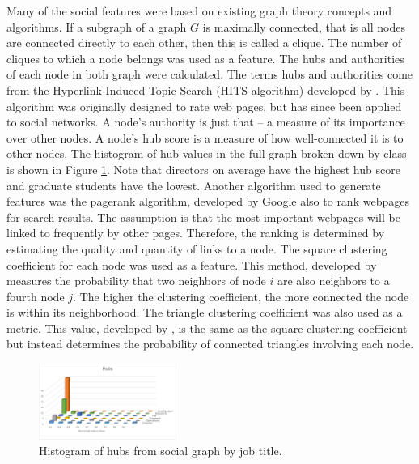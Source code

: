 \documentclass{article}
\begin{document}
Many of the social features were based on existing graph theory concepts and algorithms. If a subgraph of a graph $G$ is maximally connected, that is all nodes are connected directly to each other, then this is called a clique.  The number of cliques to which a node belongs was used as a feature.  The hubs and authorities of each node in both graph were calculated.  The terms hubs and authorities come from the Hyperlink-Induced Topic Search (HITS algorithm) developed by \cite{kleinberg_hubs_1999}.  This algorithm was originally designed to rate web pages, but has since been applied to social networks. A node's authority is just that -- a measure of its importance over other nodes.  A node's hub score is a measure of how well-connected it is to other nodes.  The histogram of hub values in the full graph broken down by class is shown in Figure \ref{fig:social_ex_hist}.  Note that directors on average have the highest hub score and graduate students have the lowest. Another algorithm used to generate features was the pagerank algorithm, developed by Google \cite{page_pagerank_1999} also to rank webpages for search results.  The assumption is that the most important webpages will be linked to frequently by other pages.  Therefore, the ranking is determined by estimating the quality and quantity of links to a node.  The square clustering coefficient for each node was used as a feature.  This method, developed by \cite{lind_cycles_2005} measures the probability that two neighbors of node $i$ are also neighbors to a fourth node $j$.  The higher the clustering coefficient, the more connected the node is within its neighborhood.  The triangle clustering coefficient was also used as a metric.  This value, developed by \cite{saramaki_generalizations_2007}, is the same as the square clustering coefficient but instead determines the probability of connected triangles involving each node.

\begin{figure}[H]
    \centering
        \includegraphics[width=0.4\textwidth]{Hubs_hist}
        \caption{Histogram of hubs from social graph by job title.}
        \label{fig:social_ex_hist}
\end{figure}
\end{document}

